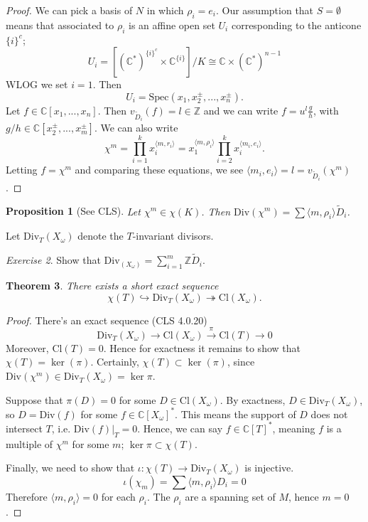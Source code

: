 \documentclass{article}
\newtheorem{theorem}{Theorem}
\newtheorem{prop}[theorem]{Proposition}
\theoremstyle{definition}
\theoremstyle{remark}
\newtheorem{exercise}[theorem]{Exercise}
\numberwithin{theorem}{section}
\newcommand{\C}{\mathbb{C}}
\newcommand{\Z}{\mathbb{Z}}
\newcommand{\Spec}{\text{Spec}}
\newcommand{\Div}{\mathrm{Div}}
\newcommand{\Cl}{\mathrm{Cl}}
\begin{document}
	\begin{proof}
		We can pick a basis of $N$ in which $\rho_i=e_i$. Our assumption that $S=\emptyset$ means that associated to $\rho_i$ is an affine open set $U_i$ corresponding to the anticone $\{i\}^c$;
		$$U_i = \left[
			(\C^\ast)^{\{i\}^c} \times \C^{\{i\}} 
		\right]/K \cong \C\times (\C^\ast)^{n-1}$$
		WLOG we set $i=1$. Then 
		$$U_i = \Spec(x_1,x_2^{\pm},...,x_n^{\pm}).$$
		Let $f\in \C[x_1,...,x_n]$. Then $v_{\tilde{D}_i}(f) = l \in \Z$ and we can write $f=u^l \frac{g}{h}$, with $g/h \in \C[x_2^\pm,...,x_m^\pm]$. We can also write 
		$$\chi^m = \prod_{i=1}^k x_i^{\langle m, r_i\rangle} = x_1^{\langle m, \rho_i\rangle}\prod_{i=2}^k x_i^{\langle m_i, e_i\rangle}.$$
		Letting $f=\chi^m$ and comparing these equations, we see $\langle m_i, e_i\rangle = l = v_{\tilde{D}_i}(\chi^m)$.
	\end{proof}
	\begin{prop}[See CLS]
		Let $\chi^m \in \chi(K)$. Then $\Div(\chi^m) = \sum \langle m, \rho_i\rangle \tilde{D}_i$.
	\end{prop}
	Let $\Div_T(X_\omega)$ denote the $T$-invariant divisors. 
	\begin{exercise}
	Show that $\Div_(X_\omega) = \sum_{i=1}^m \Z \tilde{D}_i$.
	\end{exercise}
	\begin{theorem}
		There exists a short exact sequence
		$$\chi(T) \hookrightarrow \Div_T(X_\omega) \twoheadrightarrow \Cl(X_\omega).$$
	\end{theorem}
	\begin{proof}
		There's an exact sequence (CLS 4.0.20) 
		$$\Div_T(X_\omega)\to \Cl(X_\omega)\xrightarrow{\pi}\Cl(T)\to 0$$
		Moreover, $\Cl(T)=0$. Hence for exactness it remains to show that $\chi(T)=\ker(\pi)$. Certainly, $\chi(T)\subset \ker(\pi)$, since $\Div(\chi^m)\in \Div_T(X_\omega) = \ker\pi$. \vspace{1em}
		
		Suppose that $\pi(D)=0$ for some $D\in \Cl(X_\omega)$. By exactness, $D\in \Div_T(X_\omega)$, so $D=\Div(f)$ for some $f\in \C[X_\omega]^\ast$. This means the support of $D$ does not intersect $T$, i.e. $\Div(f)|_T = 0$. Hence, we can say $f\in \C[T]^\ast$, meaning $f$ is a multiple of $\chi^m$ for some $m$; $\ker\pi\subset \chi(T)$. \vspace{1em}

		Finally, we need to show that $\iota:\chi(T)\to \Div_T(X_\omega)$ is injective. 
		$$\iota(\chi_m) = \sum \langle m, \rho_i\rangle D_i =0$$
		Therefore $\langle m, \rho_i\rangle =0$ for each $\rho_i$. The $\rho_i$ are a spanning set of $M$, hence $m=0$.
	\end{proof}
\end{document}
